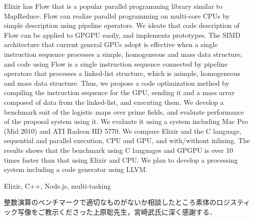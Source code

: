 \documentclass[submit,techrep]{ipsj}
\begin{document}
\begin{eabstract}
Elixir has Flow that is a popular parallel programming library similar to MapReduce. Flow can realize parallel programming on multi-core CPUs by simple description using pipeline operators. We ideate that code description of Flow can be applied to GPGPU easily, and implements prototypes. The SIMD architecture that current general GPUs adopt is effective when a single instruction sequence processes a simple, homogeneous and mass data structure, and code using Flow is a single instruction sequence connected by pipeline operators that processes a linked-list structure, which is asimple, homogeneous and mass data structure. Thus, we propose a code optimization method by compiling the instruction sequence for the GPU, sending it and a mass array composed of data from the linked-list, and executing them. We develop a benchmark suit of the logistic maps over prime fields, and evaluate performance of the proposal system using it. We evaluate it using a system including Mac Pro (Mid 2010) and ATI Radeon HD 5770. We compare Elixir and the C language, sequential and parallel execution, CPU and GPU, and with/without inlining. The results shows that the benchmark using C languages and GPGPU is over 10 times faster than that using Elixir and CPU. We plan to develop a processing system including a code generator using LLVM.
\end{eabstract}

\begin{ekeyword}
Elixir, C++, Node.js, multi-tasking
\end{ekeyword}

\maketitle



\begin{acknowledgment}
整数演算のベンチマークで適切なものがないか相談したところ素体のロジスティック写像\cite{Miyazaki14}をご教示くださった上原聡先生，宮崎武氏に深く感謝する．
\end{acknowledgment}




\end{document}
